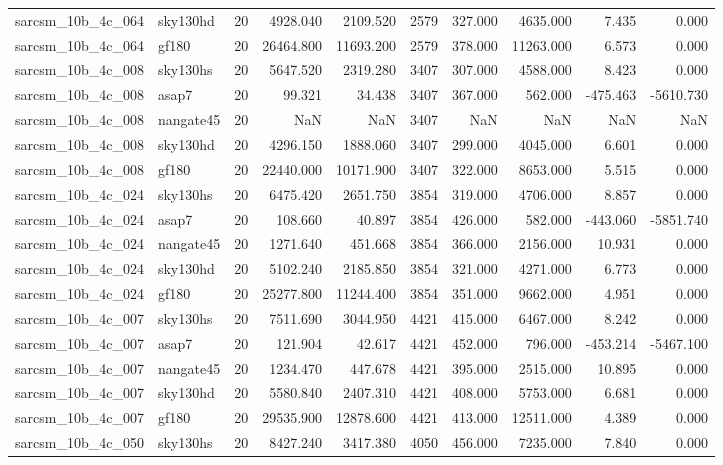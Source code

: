 \begin{tabular}{llrrrrrrrr}
sarcsm\_10b\_4c\_064 & sky130hd & 20 & 4928.040 & 2109.520 & 2579 & 327.000 & 4635.000 & 7.435 & 0.000 \\
sarcsm\_10b\_4c\_064 & gf180 & 20 & 26464.800 & 11693.200 & 2579 & 378.000 & 11263.000 & 6.573 & 0.000 \\
sarcsm\_10b\_4c\_008 & sky130hs & 20 & 5647.520 & 2319.280 & 3407 & 307.000 & 4588.000 & 8.423 & 0.000 \\
sarcsm\_10b\_4c\_008 & asap7 & 20 & 99.321 & 34.438 & 3407 & 367.000 & 562.000 & -475.463 & -5610.730 \\
sarcsm\_10b\_4c\_008 & nangate45 & 20 & NaN & NaN & 3407 & NaN & NaN & NaN & NaN \\
sarcsm\_10b\_4c\_008 & sky130hd & 20 & 4296.150 & 1888.060 & 3407 & 299.000 & 4045.000 & 6.601 & 0.000 \\
sarcsm\_10b\_4c\_008 & gf180 & 20 & 22440.000 & 10171.900 & 3407 & 322.000 & 8653.000 & 5.515 & 0.000 \\
sarcsm\_10b\_4c\_024 & sky130hs & 20 & 6475.420 & 2651.750 & 3854 & 319.000 & 4706.000 & 8.857 & 0.000 \\
sarcsm\_10b\_4c\_024 & asap7 & 20 & 108.660 & 40.897 & 3854 & 426.000 & 582.000 & -443.060 & -5851.740 \\
sarcsm\_10b\_4c\_024 & nangate45 & 20 & 1271.640 & 451.668 & 3854 & 366.000 & 2156.000 & 10.931 & 0.000 \\
sarcsm\_10b\_4c\_024 & sky130hd & 20 & 5102.240 & 2185.850 & 3854 & 321.000 & 4271.000 & 6.773 & 0.000 \\
sarcsm\_10b\_4c\_024 & gf180 & 20 & 25277.800 & 11244.400 & 3854 & 351.000 & 9662.000 & 4.951 & 0.000 \\
sarcsm\_10b\_4c\_007 & sky130hs & 20 & 7511.690 & 3044.950 & 4421 & 415.000 & 6467.000 & 8.242 & 0.000 \\
sarcsm\_10b\_4c\_007 & asap7 & 20 & 121.904 & 42.617 & 4421 & 452.000 & 796.000 & -453.214 & -5467.100 \\
sarcsm\_10b\_4c\_007 & nangate45 & 20 & 1234.470 & 447.678 & 4421 & 395.000 & 2515.000 & 10.895 & 0.000 \\
sarcsm\_10b\_4c\_007 & sky130hd & 20 & 5580.840 & 2407.310 & 4421 & 408.000 & 5753.000 & 6.681 & 0.000 \\
sarcsm\_10b\_4c\_007 & gf180 & 20 & 29535.900 & 12878.600 & 4421 & 413.000 & 12511.000 & 4.389 & 0.000 \\
sarcsm\_10b\_4c\_050 & sky130hs & 20 & 8427.240 & 3417.380 & 4050 & 456.000 & 7235.000 & 7.840 & 0.000 \\

\end{tabular}
